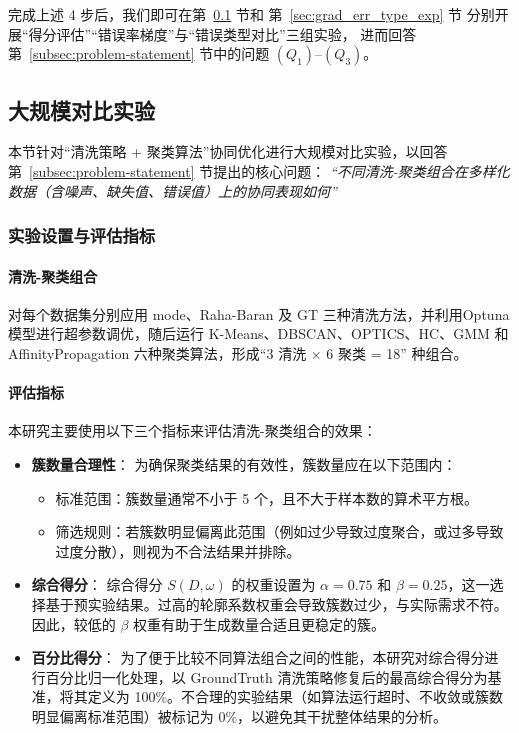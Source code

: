 \documentclass[10pt]{article} %
\numberwithin{equation}{section}
\begin{document}
\noindent
完成上述 4 步后，我们即可在第~\ref{sec:large_scale_exp} 节和
第~\ref{sec:grad_err_type_exp} 节
分别开展“得分评估”“错误率梯度”与“错误类型对比”三组实验，
进而回答第~\ref{subsec:problem-statement} 节中的问题 \((Q_1)–(Q_3)\)。


\subsection{大规模对比实验}
\label{sec:large_scale_exp}

本节针对“清洗策略 + 聚类算法”协同优化进行大规模对比实验，以回答第~\ref{subsec:problem-statement} 节提出的核心问题：
\emph{“不同清洗-聚类组合在多样化数据（含噪声、缺失值、错误值）上的协同表现如何”}

\subsubsection{实验设置与评估指标}
\label{sec:exp_setting_largeset}

\paragraph{清洗-聚类组合}
对每个数据集分别应用 mode、Raha-Baran 及 GT 三种清洗方法，并利用Optuna模型\cite{10.1145/3292500.3330701}进行超参数调优，随后运行 K-Means、DBSCAN、OPTICS、HC、GMM 和 AffinityPropagation 六种聚类算法，形成“3 清洗 × 6 聚类 = 18” 种组合。

\paragraph{评估指标}
本研究主要使用以下三个指标来评估清洗-聚类组合的效果：

\begin{itemize}
    \item \textbf{簇数量合理性}：  
    为确保聚类结果的有效性，簇数量应在以下范围内：  
    \begin{itemize}
        \item 标准范围：簇数量通常不小于 5 个，且不大于样本数的算术平方根。
        \item 筛选规则：若簇数明显偏离此范围（例如过少导致过度聚合，或过多导致过度分散），则视为不合法结果并排除。
    \end{itemize}
    
    \item \textbf{综合得分}：  
    综合得分 \(S(D,\omega)\) 的权重设置为 \(\alpha = 0.75\) 和 \(\beta = 0.25\)，这一选择基于预实验结果。过高的轮廓系数权重会导致簇数过少，与实际需求不符。因此，较低的 \(\beta\) 权重有助于生成数量合适且更稳定的簇。

    \item \textbf{百分比得分}：  
    为了便于比较不同算法组合之间的性能，本研究对综合得分进行百分比归一化处理，以 GroundTruth 清洗策略修复后的最高综合得分为基准，将其定义为 100\%。不合理的实验结果（如算法运行超时、不收敛或簇数明显偏离标准范围）被标记为 0\%，以避免其干扰整体结果的分析。

\end{itemize}
\end{document}
